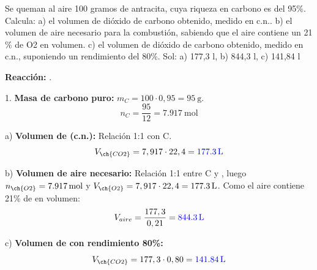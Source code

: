 \begin{exercise}
    Se queman al aire 100 gramos de antracita, cuya riqueza en carbono es del 95\%. Calcula: a) el volumen de dióxido de carbono obtenido, medido en c.n.. b) el volumen de aire necesario para la combustión, sabiendo que el aire contiene un 21 \% de O2 en volumen. c) el volumen de dióxido de carbono obtenido, medido en c.n., suponiendo un rendimiento del 80\%. Sol: a) 177,3 l, b) 844,3 l, c) 141,84 l
    \begin{solu}
        \textbf{Reacción:} .

        1. \textbf{Masa de carbono puro:} $m_C = 100 \cdot 0,95 = \qty{95}{\g}$.
        \[ n_C = \dfrac{95}{12} = \qty{7,917}{\mol} \]

        a) \textbf{Volumen de  (c.n.):} Relación 1:1 con C.
        \[ V_{\ch{CO2}} = 7,917 \cdot 22,4 = \mathbf{\textcolor{blue}{\qty{177,3}{\L}}} \]

        b) \textbf{Volumen de aire necesario:} Relación 1:1 entre C y , luego $n_{\ch{O2}} = \qty{7,917}{\mol}$ y $V_{\ch{O2}} = 7,917 \cdot 22,4 = \qty{177,3}{\L}$. Como el aire contiene 21\% de  en volumen:
        \[ V_{aire} = \dfrac{177,3}{0,21} = \mathbf{\textcolor{blue}{\qty{844,3}{\L}}} \]

        c) \textbf{Volumen de  con rendimiento 80\%:}
        \[ V_{\ch{CO2}} = 177,3 \cdot 0,80 = \mathbf{\textcolor{blue}{\qty{141,84}{\L}}} \]
    \end{solu}
\end{exercise}


